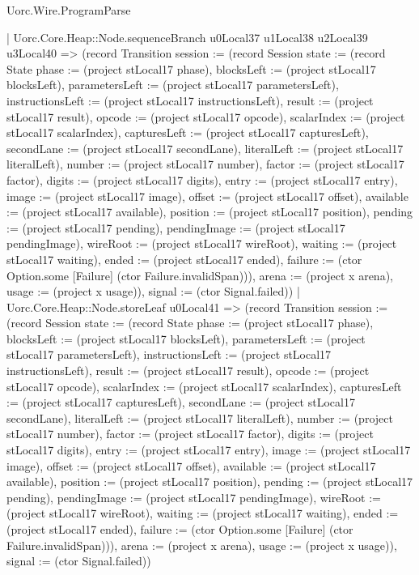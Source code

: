 \begin{lexlean}{Uorc.Wire.ProgramParse}
\begin{semanticmodule}
{          | Uorc.Core.Heap::Node.sequenceBranch u0Local37 u1Local38 u2Local39 u3Local40 => (record Transition {session := (record Session {state := (record State {phase := (project stLocal17 phase), blocksLeft := (project stLocal17 blocksLeft), parametersLeft := (project stLocal17 parametersLeft), instructionsLeft := (project stLocal17 instructionsLeft), result := (project stLocal17 result), opcode := (project stLocal17 opcode), scalarIndex := (project stLocal17 scalarIndex), capturesLeft := (project stLocal17 capturesLeft), secondLane := (project stLocal17 secondLane), literalLeft := (project stLocal17 literalLeft), number := (project stLocal17 number), factor := (project stLocal17 factor), digits := (project stLocal17 digits), entry := (project stLocal17 entry), image := (project stLocal17 image), offset := (project stLocal17 offset), available := (project stLocal17 available), position := (project stLocal17 position), pending := (project stLocal17 pending), pendingImage := (project stLocal17 pendingImage), wireRoot := (project stLocal17 wireRoot), waiting := (project stLocal17 waiting), ended := (project stLocal17 ended), failure := (ctor Option.some [Failure] (ctor Failure.invalidSpan))}), arena := (project x arena), usage := (project x usage)}), signal := (ctor Signal.failed)})
          | Uorc.Core.Heap::Node.storeLeaf u0Local41 => (record Transition {session := (record Session {state := (record State {phase := (project stLocal17 phase), blocksLeft := (project stLocal17 blocksLeft), parametersLeft := (project stLocal17 parametersLeft), instructionsLeft := (project stLocal17 instructionsLeft), result := (project stLocal17 result), opcode := (project stLocal17 opcode), scalarIndex := (project stLocal17 scalarIndex), capturesLeft := (project stLocal17 capturesLeft), secondLane := (project stLocal17 secondLane), literalLeft := (project stLocal17 literalLeft), number := (project stLocal17 number), factor := (project stLocal17 factor), digits := (project stLocal17 digits), entry := (project stLocal17 entry), image := (project stLocal17 image), offset := (project stLocal17 offset), available := (project stLocal17 available), position := (project stLocal17 position), pending := (project stLocal17 pending), pendingImage := (project stLocal17 pendingImage), wireRoot := (project stLocal17 wireRoot), waiting := (project stLocal17 waiting), ended := (project stLocal17 ended), failure := (ctor Option.some [Failure] (ctor Failure.invalidSpan))}), arena := (project x arena), usage := (project x usage)}), signal := (ctor Signal.failed)})
}
\end{semanticmodule}
\end{lexlean}

